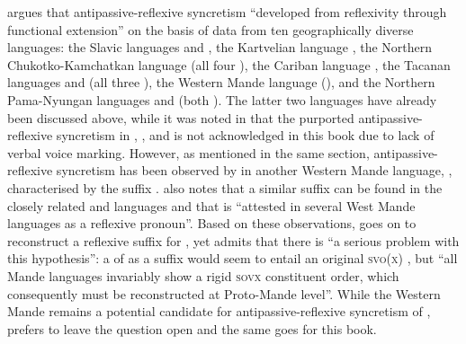 \citet[159]{janic:2010} argues that antipassive-reflexive syncretism “developed from reflexivity through functional extension” on the basis of data from ten geographically diverse languages: the Slavic languages  and , the Kartvelian language , the Northern Chukotko-Kamchatkan language  (all four ), the Cariban language , the Tacanan languages  and  (all three ), the Western Mande language  (), and the Northern Pama-Nyungan languages  and  (both ). The latter two languages have already been discussed above, while it was noted in  that the purported antipassive-reflexive syncretism in , ,  and  is not acknowledged in this book due to lack of verbal voice marking. However, as mentioned in the same section, antipassive-reflexive syncretism has been observed by \citet{creissels:2012, creissels:2015} in another Western Mande language, , characterised by the suffix . \citet[13]{creissels:2015} also notes that a similar suffix can be found in the closely related  and  languages and that  is “attested in several West Mande languages as a reflexive pronoun”. Based on these observations, \citet[13]{creissels:2015} goes on to reconstruct a reflexive suffix  for , yet admits that there is “a serious problem with this hypothesis”: a  of  as a suffix would seem to entail an original \textsc{svo(x)} , but “all Mande languages invariably show a rigid \textsc{sovx} constituent order, which consequently must be reconstructed at Proto-Mande level”. While the Western Mande  remains a potential candidate for antipassive-reflexive syncretism of , \citeauthor{creissels:2015} prefers to leave the question open and the same goes for this book.

